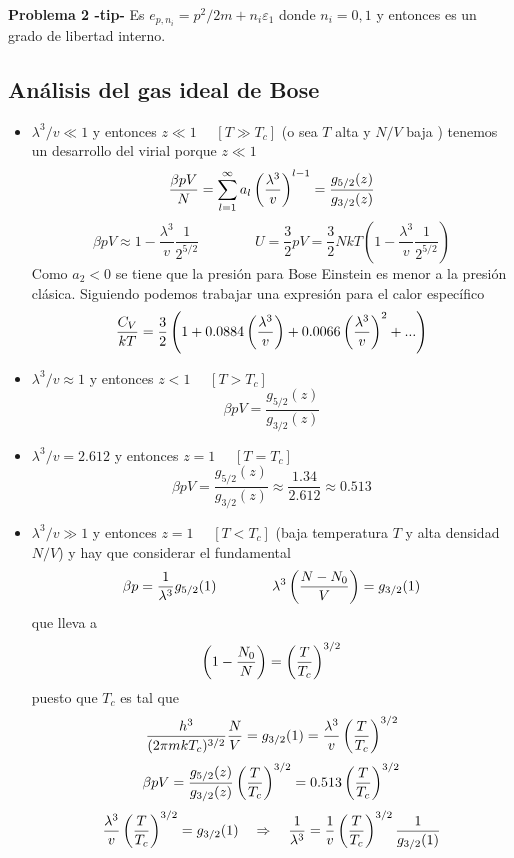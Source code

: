 \documentclass[10pt,oneside]{CBFT_book}
\begin{document}
\begin{ejemplo}{\bf Problema 2 -tip-}
Es $e_{p,n_i} = p^2/ 2m + n_i \varepsilon_1 $ donde $n_i=0,1$ y entonces es un grado de libertad interno.
 
\end{ejemplo}


\subsection{Análisis del gas ideal de Bose}

\begin{itemize}
 \item $ \lambda^3 / v \ll 1 $ y entonces $ z \ll 1 $ $\quad  [T \gg T_c ] $ (o sea $T$ alta y $N/V$ baja )
 tenemos un desarrollo del virial porque $z \ll 1$
 \[
	\frac{\beta p V}{N} = \sum_{l=1}^\infty a_l \left( \frac{ \lambda^3 }{ v } \right)^{l-1} = \frac{ g_{5/2}(z) }{ g_{3/2}(z) }
 \]
 \[
	\beta p V \approx 1 - \frac{\lambda^3}{v} \frac{1}{2^{5/2}} \qquad \qquad 
	U = \frac{3}{2}pV = \frac{3}{2} NkT \left( 1 - \frac{\lambda^3}{v} \frac{1}{2^{5/2}} \right)
 \]
 Como $a_2 < 0$ se tiene que la presión para Bose Einstein es menor a la presión clásica. Siguiendo
 podemos trabajar una expresión para el calor específico
 \[
	\frac{C_V}{kT} = \frac{3}{2} \left( 1 + 0.0884 \left( \frac{ \lambda^3 }{ v } \right) + 
	0.0066 \left( \frac{ \lambda^3 }{ v } \right)^2 + ... \right)
 \]
 
 \item $ \lambda^3 / v \approx 1 $ y entonces $ z < 1 $ $\quad  [T > T_c ] $
 \[
	\beta p V = \frac{ g_{5/2}(z) }{ g_{3/2}(z) }
 \]
 \item  $ \lambda^3 / v = 2.612 $ y entonces $ z = 1 $ $\quad  [T = T_c ] $
 \[
	\beta p V = \frac{ g_{5/2}(z) }{ g_{3/2}(z) } \approx \frac{1.34}{2.612} \approx 0.513
 \]
 \item $ \lambda^3 / v \gg 1 $ y entonces $ z = 1 $ $\quad  [T < T_c ] $ (baja temperatura $T$ y alta
 densidad $N/V$) y hay que considerar el  fundamental
 \[
	\beta p = \frac{1}{\lambda^3} g_{5/2}(1) \qquad \qquad \lambda^3\left( \frac{ N-N_0 }{ V } \right) = g_{3/2}(1)
 \]
 que lleva a 
 \[
	\left( 1 - \frac{N_0}{N} \right) = \left( \frac{ T }{ T_c } \right)^{3/2}
 \]
 puesto que $T_c$ es tal que 
 \[
	\frac{h^3}{(2\pi m kT_c)^{3/2}} \frac{N}{V} = g_{3/2}(1) = \frac{\lambda^3}{v}\left( \frac{ T }{ T_c } \right)^{3/2}
 \]
 \[
	\beta p V = \frac{ g_{5/2}(z) }{ g_{3/2}(z) } \left( \frac{ T }{ T_c } \right)^{3/2} = 0.513 \left( \frac{ T }{ T_c } \right)^{3/2}
 \]
 \[
	\frac{\lambda^3}{v} \left( \frac{ T }{ T_c } \right)^{3/2} = g_{3/2}(1) \quad \Rightarrow \quad \frac{1}{\lambda^3} =
	\frac{1}{v}\left( \frac{ T }{ T_c } \right)^{3/2} \frac{1}{g_{3/2}(1)}
 \]
\end{itemize}
\end{document}
